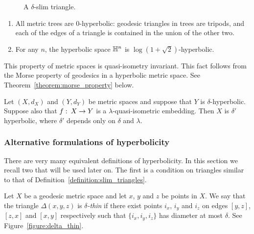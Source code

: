 \begin{figure}
  \begin{center}
    
  \end{center}
  \caption{A $\delta$-slim triangle.}
  \label{figure:delta_slim}
\end{figure}

\begin{example}
  \begin{enumerate}
    \item All metric trees are $0$-hyperbolic: geodesic triangles in trees are tripods, and each of the edges of a triangle is contained in the union of the other two.
    \item For any $n$, the hyperbolic space $\mathbb{H}^n$ is $\log(1 + \sqrt{2})$-hyperbolic.
  \end{enumerate}
\end{example}

This property of metric spaces is quasi-isometry invariant.
This fact follows from the Morse property of geodesics in a hyperbolic metric space.
See Theorem~\ref{theorem:morse_property} below.

\begin{lemma}\label{lemma:hyperbolicity_is_QI_invariant}
  Let $(X, d_X)$ and $(Y, d_Y)$ be metric spaces and suppose that $Y$ is $\delta$-hyperbolic.
  Suppose also that $f \operatorname{\colon} X \to Y$ is a $\lambda$-quasi-isometric embedding.
  Then $X$ is $\delta'$ hyperbolic, where $\delta'$ depends only on $\delta$ and $\lambda$.
\end{lemma}

\subsubsection{Alternative formulations of hyperbolicity}

There are very many equivalent definitions of hyperbolicity. 
In this section we recall two that will be used later on. 
The first is a condition on triangles similar to that of Definition~\ref{definition:slim_triangles}.

\begin{definition}\label{definition:thin_triangles}
  Let $X$ be a geodesic metric space and let $x$, $y$ and $z$ be points in $X$.
  We say that the triangle $\Delta(x, y, z)$ is \emph{$\delta$-thin} if there exist points $i_x$, $i_y$ and $i_z$ on edges $[y,z]$, $[z,x]$ and $[x,y]$ respectively such that $\{i_x, i_y, i_z\}$ has diameter at most $\delta$.
  See Figure~\ref{figure:delta_thin}.
\end{definition}

